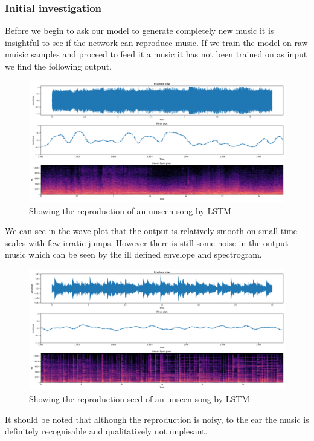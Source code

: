 \documentclass{article}
\begin{document}
\subsubsection{Initial investigation}
Before we begin to ask our model to generate completely new music it is insightful to see if the network can reproduce music. If we train the model on raw muisic samples and proceed to feed it a music it has not been trained on as input we find the following output.
\begin{figure}[H]
\caption{Showing the reproduction of an unseen song by LSTM}
\includegraphics[scale=0.35]{reproduce1.png}
\end{figure}
We can see in the wave plot that the output is relatively smooth on small time scales with few irratic jumps. However there is still some noise in the output music which can be seen by the ill defined envelope and spectrogram. 
\begin{figure}[H]
\caption{Showing the reproduction seed of an unseen song by LSTM}
\includegraphics[scale=0.35]{reproductionSeed.png}
\end{figure}
It should be noted that although the reproduction is noisy, to the ear the music is definitely recognisable and qualitatively not unplesant. 
\end{document}
